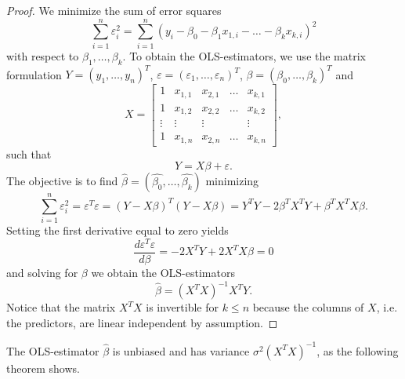 \documentclass[a4paper, 12pt]{scrreprt}
\begin{document}
\begin{proof}
We minimize the sum of error squares 
\begin{equation}
\sum_{i=1}^n \varepsilon_i^2 = \sum_{i=1}^n (y_i - \beta_0 - \beta_1 x_{1,i} - \ldots - \beta_k x_{k,i})^2
\end{equation}
with respect to $\beta_1, \ldots, \beta_k$.
To obtain the OLS-estimators, we use the matrix formulation $Y = (y_1, \ldots, y_n)^T$, $\varepsilon = (\varepsilon_1, \ldots, \varepsilon_n)^T$, $\beta = (\beta_0, \ldots, \beta_k)^T$ and
\begin{equation} \label{matrix:X}
X= 
\begin{bmatrix}
1 & x_{1,1} & x_{2,1} & \dots & x_{k,1} \\
1 & x_{1,2} & x_{2,2} & \dots & x_{k,2} \\
\vdots & \vdots & \vdots & & \vdots \\
1 & x_{1,n} & x_{2,n} & \dots & x_{k,n} \end{bmatrix}, 
\end{equation} 
such that
\begin{equation}\label{OLS:eq}
 Y = X\beta + \varepsilon.
\end{equation}
The objective is to find $\hat{\beta} = (\hat{\beta_0}, \ldots, \hat{\beta_k})$ minimizing 
\[  \sum_{i=1}^n \varepsilon_i^2 = \varepsilon^T \varepsilon  = ( Y- X\beta)^T (Y-X\beta)= Y^T Y - 2\beta^T X^T Y + \beta^T X^T X \beta. \]
Setting the first derivative equal to zero yields
\[ \frac{d \varepsilon^T \varepsilon}{d \beta} = -2X^T Y + 2 X^T X \beta = 0 \]
and solving for $\beta$ we obtain the OLS-estimators
\begin{equation*}
\hat{\beta} = (X^T X)^{-1} X^T Y.
\end{equation*}
Notice that the matrix $X^T X$ is invertible for $k \leq n$ because the columns of $X$, i.e. the predictors, are linear independent by assumption.
\end{proof}

The OLS-estimator $\hat{\beta}$ is unbiased and has variance $\sigma^2 (X^T X)^{-1}$, as the following theorem shows.
\end{document}
